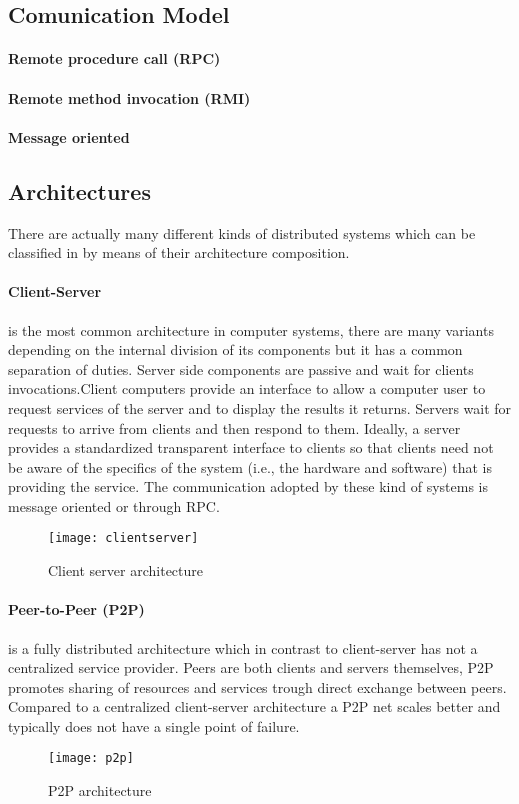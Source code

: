 \subsection{Comunication Model}
\paragraph{Remote procedure call (RPC)}
\paragraph{Remote method invocation (RMI)}
\paragraph{Message oriented}

\subsection{Architectures}
\par
There are actually many different kinds of distributed systems which can be classified in by means of their architecture composition.
\paragraph{Client-Server} is the most common architecture in computer systems, there are many variants depending on the internal division of its components but it has a common separation of duties. Server side components are passive and wait for clients invocations.Client computers provide an interface to allow a computer user to request services of the server and to display the results it returns. Servers wait for requests to arrive from clients and then respond to them. Ideally, a server provides a standardized transparent interface to clients so that clients need not be aware of the specifics of the system (i.e., the hardware and software) that is providing the service. The communication adopted by these kind of systems is message oriented or through RPC.
\begin{figure}[h]
	\centering
	\texttt{[image: clientserver]}
	\caption{Client server architecture}
	\label{fig:2.10}
\end{figure} 
\paragraph{Peer-to-Peer (P2P)} is a fully distributed architecture which in contrast to client-server has not a centralized service provider. Peers are both clients and servers themselves, P2P promotes sharing of resources and services trough direct exchange between peers. Compared to a centralized client-server architecture a P2P net scales better and typically does not have a single point of failure. 
\begin{figure}[h]
	\centering
	\texttt{[image: p2p]}
	\caption{P2P architecture}
	\label{fig:2.11}
\end{figure} 
